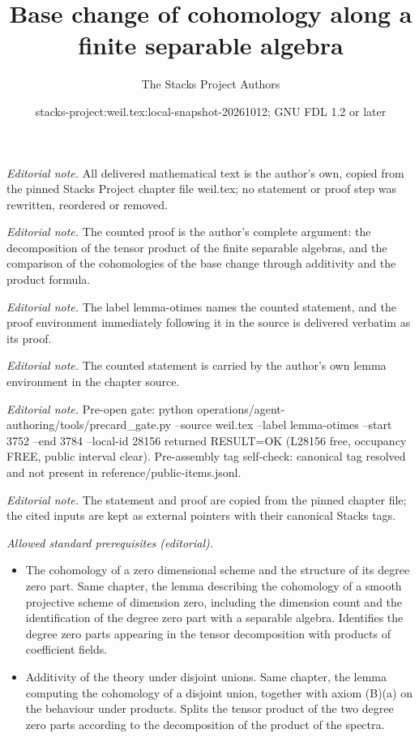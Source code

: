 \documentclass[10pt,a4paper]{amsart}
\title{Base change of cohomology along a finite separable algebra}
\author{The Stacks Project Authors}
\date{stacks-project:weil.tex:local-snapshot-20261012; GNU FDL 1.2 or later}
\theoremstyle{plain}
\theoremstyle{definition}
\theoremstyle{remark}
\numberwithin{equation}{subsection}
\begin{document}
\maketitle
\noindent\textit{Editorial note.} All delivered mathematical text is the author's own, copied from the pinned Stacks Project chapter file weil.tex; no statement or proof step was rewritten, reordered or removed.\par\medskip
\noindent\textit{Editorial note.} The counted proof is the author's complete argument: the decomposition of the tensor product of the finite separable algebras, and the comparison of the cohomologies of the base change through additivity and the product formula.\par\medskip
\noindent\textit{Editorial note.} The label lemma-otimes names the counted statement, and the proof environment immediately following it in the source is delivered verbatim as its proof.\par\medskip
\noindent\textit{Editorial note.} The counted statement is carried by the author's own lemma environment in the chapter source.\par\medskip
\noindent\textit{Editorial note.} Pre-open gate: python operations/agent-authoring/tools/precard\_gate.py --source weil.tex --label lemma-otimes --start 3752 --end 3784 --local-id 28156 returned RESULT=OK (L28156 free, occupancy FREE, public interval clear). Pre-assembly tag self-check: canonical tag resolved and not present in reference/public-items.jsonl.\par\medskip
\noindent\textit{Editorial note.} The statement and proof are copied from the pinned chapter file; the cited inputs are kept as external pointers with their canonical Stacks tags.\par\medskip
\noindent\textit{Allowed standard prerequisites (editorial).}\begin{itemize}
\item The cohomology of a zero dimensional scheme and the structure of its degree zero part. Same chapter, the lemma describing the cohomology of a smooth projective scheme of dimension zero, including the dimension count and the identification of the degree zero part with a separable algebra. Identifies the degree zero parts appearing in the tensor decomposition with products of coefficient fields.
\item Additivity of the theory under disjoint unions. Same chapter, the lemma computing the cohomology of a disjoint union, together with axiom (B)(a) on the behaviour under products. Splits the tensor product of the two degree zero parts according to the decomposition of the product of the spectra.
\end{itemize}\medskip
\end{document}
